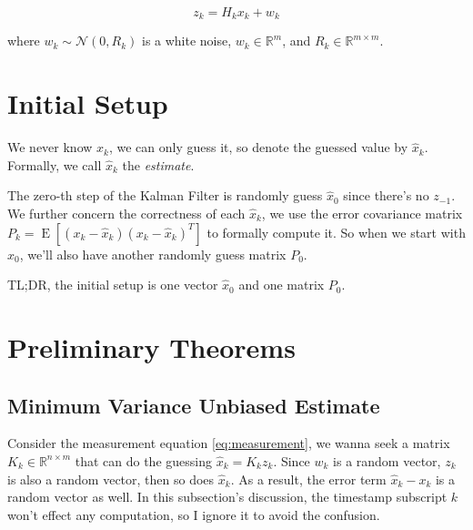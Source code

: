 \documentclass{article}
\begin{document}
            \begin{equation}\label{eq:measurement}
                 z_{k} = H_{k} x_{k} + w_{k}
            \end{equation}

            where $ w_{k} \sim \mathcal{N}(0, R_{k}) $ is a white noise, $ w_{k} \in
            \mathbb{R}^{m} $, and $ R_{k} \in \mathbb{R}^{m \times m} $.

    \section{Initial Setup}

        We never know $ x_{k} $, we can only guess it, so denote the guessed value
        by $ \hat{x}_{k} $. Formally, we call $ \hat{x}_{k} $ the \textit{estimate}.

        The zero-th step of the Kalman Filter is randomly guess $ \hat{x}_{0} $
        since there's no $ z_{-1} $. We further concern the correctness of each
        $ \hat{x}_{k} $, we use the error covariance matrix $ P_{k} =
        \operatorname{E}[(x_{k} - \hat{x}_{k})(x_{k} - \hat{x}_{k})^{T}] $ to
        formally compute it. So when we start with $ x_{0} $, we'll also have
        another randomly guess matrix $ P_{0} $.

        TL;DR, the initial setup is one
        vector $ \hat{x}_{0} $ and one matrix $ P_{0} $.

    \section{Preliminary Theorems}

        \subsection{Minimum Variance Unbiased Estimate}

            Consider the measurement equation \eqref{eq:measurement}, we wanna seek
            a matrix $ K_{k} \in \mathbb{R}^{n \times m} $ that can do the guessing
            $ \hat{x}_{k} = K_{k}z_{k} $. Since $ w_{k} $ is a random vector, $
            z_{k} $ is also a random vector, then so does $ \hat{x}_{k} $. As a
            result, the error term $ \hat{x}_{k} - x_{k} $ is a random vector as
            well. In this subsection's discussion, the timestamp subscript $ k $
            won't effect any computation, so I ignore it to avoid the confusion.
\end{document}
